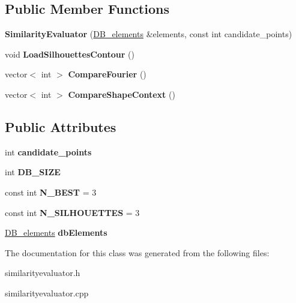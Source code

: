 \subsection*{Public Member Functions}
\begin{DoxyCompactItemize}
\item 
{\bfseries Similarity\+Evaluator} (\hyperlink{class_d_b__elements}{D\+B\+\_\+elements} \&elements, const int candidate\+\_\+points)\hypertarget{class_similarity_evaluator_af57882bf4c3246f8b0fc01762229da69}{}\label{class_similarity_evaluator_af57882bf4c3246f8b0fc01762229da69}

\item 
void {\bfseries Load\+Silhouettes\+Contour} ()\hypertarget{class_similarity_evaluator_af03cc295b586ccf9488679d6522de322}{}\label{class_similarity_evaluator_af03cc295b586ccf9488679d6522de322}

\item 
vector$<$ int $>$ {\bfseries Compare\+Fourier} ()\hypertarget{class_similarity_evaluator_a48db0709896d183332421205bdd0b414}{}\label{class_similarity_evaluator_a48db0709896d183332421205bdd0b414}

\item 
vector$<$ int $>$ {\bfseries Compare\+Shape\+Context} ()\hypertarget{class_similarity_evaluator_af6fca85ce5d1cb8f120860cbad197767}{}\label{class_similarity_evaluator_af6fca85ce5d1cb8f120860cbad197767}

\end{DoxyCompactItemize}
\subsection*{Public Attributes}
\begin{DoxyCompactItemize}
\item 
int {\bfseries candidate\+\_\+points}\hypertarget{class_similarity_evaluator_a7467ef9610c6a71aa0427029af1ed273}{}\label{class_similarity_evaluator_a7467ef9610c6a71aa0427029af1ed273}

\item 
int {\bfseries D\+B\+\_\+\+S\+I\+ZE}\hypertarget{class_similarity_evaluator_a36860f8a89407aced89f7af45889eeba}{}\label{class_similarity_evaluator_a36860f8a89407aced89f7af45889eeba}

\item 
const int {\bfseries N\+\_\+\+B\+E\+ST} = 3\hypertarget{class_similarity_evaluator_a2b1157b496d0bbe69955373df190b859}{}\label{class_similarity_evaluator_a2b1157b496d0bbe69955373df190b859}

\item 
const int {\bfseries N\+\_\+\+S\+I\+L\+H\+O\+U\+E\+T\+T\+ES} = 3\hypertarget{class_similarity_evaluator_a71a77ff07d798b82123d84727ec0abe0}{}\label{class_similarity_evaluator_a71a77ff07d798b82123d84727ec0abe0}

\item 
\hyperlink{class_d_b__elements}{D\+B\+\_\+elements} {\bfseries db\+Elements}\hypertarget{class_similarity_evaluator_a4e1e65229b89da6ceb29cfd0be1741cb}{}\label{class_similarity_evaluator_a4e1e65229b89da6ceb29cfd0be1741cb}

\end{DoxyCompactItemize}


The documentation for this class was generated from the following files\+:\begin{DoxyCompactItemize}
\item 
similarityevaluator.\+h\item 
similarityevaluator.\+cpp\end{DoxyCompactItemize}
